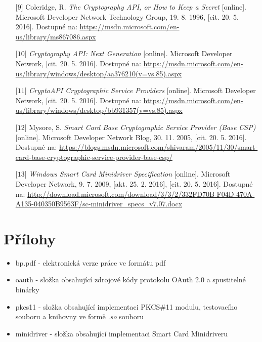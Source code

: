 \documentclass[]{fithesis3}
\begin{document}
{\begin{itemize}
	\item[$\mbox{[9]}$] Coleridge, R. \textit{The Cryptography API, or How to Keep a Secret} [online]. Microsoft Developer Network Technology Group, 19. 8. 1996, [cit. 20. 5. 2016]. Dostupné na: \url{https://msdn.microsoft.com/en-us/library/ms867086.aspx}

	\item[$\mbox{[10]}$] \textit{Cryptography API: Next Generation} [online]. Microsoft Developer Network, [cit. 20. 5. 2016]. Dostupné na: \url{https://msdn.microsoft.com/en-us/library/windows/desktop/aa376210(v=vs.85).aspx}

	\item[$\mbox{[11]}$] \textit{CryptoAPI Cryptographic Service Providers} [online]. Microsoft Developer Network, [cit. 20. 5. 2016]. Dostupné na: \url{https://msdn.microsoft.com/en-us/library/windows/desktop/bb931357(v=vs.85).aspx}

	\item[$\mbox{[12]}$] Mysore, S. \textit{Smart Card Base Cryptographic Service Provider (Base CSP)} [online]. Microsoft Developer Network Blog, 30. 11. 2005, [cit. 20. 5. 2016]. Dostupné na: \url{https://blogs.msdn.microsoft.com/shivaram/2005/11/30/smart-card-base-cryptographic-service-provider-base-csp/}

	\item[$\mbox{[13]}$] \textit{Windows Smart Card Minidriver Specification} [online]. Microsoft Developer Network, 9. 7. 2009, [akt. 25. 2. 2016], [cit. 20. 5. 2016]. Dostupné na: \url{http://download.microsoft.com/download/3/3/2/332FD70B-F04D-470A-A135-040350B9563F/sc-minidriver_specs_v7.07.docx}
\end{itemize}
}


\appendix %
\chapter{Přílohy}

	\begin{itemize}
		\item bp.pdf - elektronická verze práce ve formátu pdf

		\item oauth - složka obsahující zdrojové kódy protokolu OAuth 2.0 a spustitelné binárky

		\item pkcs11 - složka obsahující implementaci PKCS\#11 modulu, testovacího souboru a  			knihovny ve formě \textit{.so} souboru

		\item minidriver - složka obsahující implementaci Smart Card Minidriveru
	\end{itemize}
\end{document}
